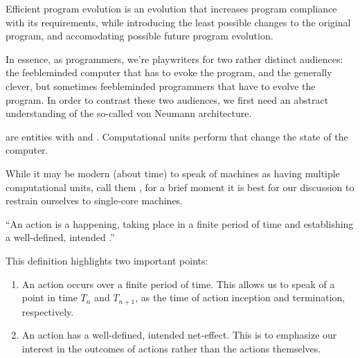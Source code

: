 \begin{definition}

Efficient program evolution is an evolution that increases program compliance
with its requirements, while introducing the least possible changes to the
original program, and accomodating possible future program  evolution.

\end{definition}

In essence, as programmers, we're playwriters for two rather distinct
audiences: the feebleminded computer that has to evoke the program, and the
generally clever, but sometimes feebleminded programmers that have to evolve
the program. In order to contrast these two audiences, we first need an
abstract understanding of the so-called von Neumann architecture.

\begin{definition}

 are entities with  and .
Computational units perform  that change the state of the
computer.

\end{definition}

While it may be modern (about time) to speak of machines as having multiple
computational units, call them , for a brief moment it is best for
our discussion to restrain ourselves to single-core machines.

\begin{definition}

``An action is a happening, taking place in a finite period of time and
establishing a well-defined, intended .''
\cite{dijkstra-introduction}

\end{definition}

This definition highlights two important points:

\begin{enumerate}

\item An action occurs over a finite period of time. This allows us to speak of
a point in time $T_n$ and $T_{n+1}$, as the time of action inception and
termination, respectively.

\item An action has a well-defined, intended net-effect. This is to emphasize
our interest in the outcomes of actions rather than the actions themselves.

\end{enumerate}

